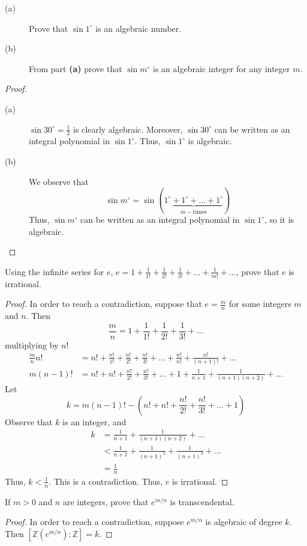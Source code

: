 \documentclass[12pt,leqno]{article}
\numberwithin{equation}{section}
\newcommand{\question}[2] {\vspace{.25in} \noindent\fbox{#1} #2 \vspace{.10in}}
\theoremstyle{definition}
\begin{document}
\question{15}{ }
\begin{description}
 \item [(a)] Prove that $\sin1^{\circ}$ is an algebraic number.
 \item [(b)] From part \textbf{(a)} prove that $\sin m^{\circ}$ is an algebraic integer for any integer $m$.
\end{description}

\begin{proof}
 \begin{description}
  \item [(a)] $\sin30^{\circ}=\frac{1}{2}$ is clearly algebraic. Moreover, $\sin30^{\circ}$ can be written as an integral polynomial in $\sin1^{\circ}$. Thus, $\sin1^{\circ}$ is algebraic.
  \item [(b)] We observe that \[\sin m^{\circ}=\sin\left(\underbrace{1^{\circ}+1^{\circ}+\hdots+1^{\circ}}_{m-\text{times}}\right)\] Thus, $\sin m^{\circ}$ can be written as an integral polynomial in $\sin1^{\circ}$, so it is algebraic.
 \end{description}

\end{proof}


\question{1}{Using the infinite series for $e$, $e=1+\frac{1}{1!}+\frac{1}{2!}+\frac{1}{3!}+\hdots+\frac{1}{m!}+\hdots$, prove that $e$ is irrational.}

\begin{proof}
 In order to reach a contradiction, suppose that $e=\frac{m}{n}$ for some integers $m$ and $n$. Then \[\frac{m}{n}=1+\frac{1}{1!}+\frac{1}{2!}+\frac{1}{3!}+\hdots\] multiplying by $n!$ \begin{align*}\frac{m}{n}n!&=n!+\frac{n!}{1!}+\frac{n!}{2!}+\frac{n!}{3!}+\hdots+\frac{n!}{n!}+\frac{n!}{(n+1)!}+\hdots\\m(n-1)!&=n!+n!+\frac{n!}{2!}+\frac{n!}{3!}+\hdots+1+\frac{1}{n+1}+\frac{1}{(n+1)(n+2)}+\hdots\end{align*} Let \[k=m(n-1)!-\left(n!+n!+\frac{n!}{2!}+\frac{n!}{3!}+\hdots+1\right)\] Observe that $k$ is an integer, and \begin{align*}k&=\frac{1}{n+1}+\frac{1}{(n+1)(n+2)}+\hdots\\&<\frac{1}{n+1}+\frac{1}{(n+1)^2}+\frac{1}{(n+1)^3}+\hdots\\&=\frac{1}{n}\end{align*} Thus, $k<\frac{1}{n}$. This is a contradiction. Thus, $e$ is irrational.
\end{proof}


\question{4}{If $m>0$ and $n$ are integers, prove that $e^{m/n}$ is transcendental.}

\begin{proof}
 In order to reach a contradiction, suppose $e^{m/n}$ is algebraic of degree $k$. Then $[\mathbb{Z}(e^{m/n}):\mathbb{Z}]=k$.
\end{proof}
\end{document}

